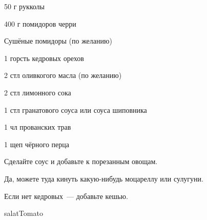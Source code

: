 {\label{arugula}
\item 50 г рукколы
\item 400 г помидоров черри
\item Сушёные помидоры (по желанию)
\item 1 горсть кедровых орехов
}{
\item 2 стл оливкогого масла (по желанию)
\item 2 стл лимонного сока
\item 1 стл гранатового соуса или соуса шиповника
\item 1 чл прованских трав
\item 1 щеп чёрного перца
}{
Сделайте соус и добавьте к порезанным овощам.
}{
\begin{advice}
\item Да, можете туда кинуть какую-нибудь моцареллу или сулугуни.
\item Если нет кедровых~--- добавьте кешью.
\end{advice}}{salatTomato}


